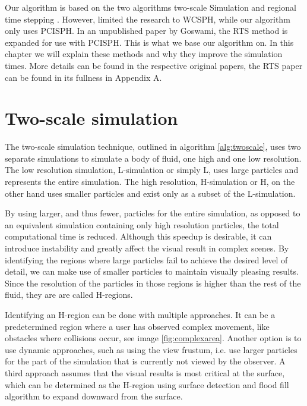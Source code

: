 \documentclass[../../main.tex]{subfiles}
\begin{document}
\tracingall

Our algorithm is based on the two algorithms two-scale Simulation \citep{solenthaler2011two} and regional time stepping \citep{goswami2014regional}. However, \citet{goswami2014regional} limited the research to WCSPH, while our algorithm only uses PCISPH. In an unpublished paper by Goswami, the RTS method is expanded for use with PCISPH. This is what we base our algorithm on. In this chapter we will explain these methods and why they improve the simulation times. More details can be found in the respective original papers, the RTS paper can be found in its fullness in Appendix A.

\section{Two-scale simulation}
\label{sec:twoscale}
The two-scale simulation technique, outlined in algorithm \ref{alg:twoscale}, uses two separate simulations to simulate a body of fluid, one high and one low resolution. The low resolution simulation, L-simulation or simply L, uses large particles and represents the entire simulation. The high resolution, H-simulation or H, on the other hand uses smaller particles and exist only as a subset of the L-simulation. 

By using larger, and thus fewer, particles for the entire simulation, as opposed to an equivalent simulation containing only high resolution particles, the total computational time is reduced. Although this speedup is desirable, it can introduce instability and greatly affect the visual result in complex scenes. By identifying the regions where large particles fail to achieve the desired level of detail, we can make use of smaller particles to maintain visually pleasing results. Since the resolution of the particles in those regions is higher than the rest of the fluid, they are are called H-regions.

Identifying an H-region can be done with multiple approaches. It can be a predetermined region where a user has observed complex movement, like obstacles where collisions occur, see image \ref{fig:complexarea}. Another option is to use dynamic approaches, such as using the view frustum, i.e. use larger particles for the part of the simulation that is currently not viewed by the observer. A third approach assumes that the visual results is most critical at the surface, which can be determined as the H-region using surface detection \citep{solenthaler2007efficient} and flood fill algorithm to expand downward from the surface.
\end{document}

